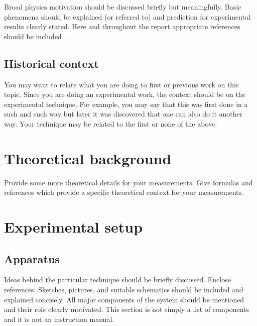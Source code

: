 \documentclass[10pt,letterpaper,onecolumn]{article}
\begin{document}
Broad physics motivation should be discussed briefly but
meaningfully. Basic phenomena should be
explained (or referred to) and
prediction for experimental results clearly
stated. Here and throughout the report appropriate
references should be included~\cite{book, article}.

\subsection{Historical context}

You may want to relate what you are doing to first or previous
work on this topic. Since you are doing an experimental work,
the context should be on the experimental technique. For example,
you may say that this was first done in a such and such way
but later it was discovered
that one can also do it another way. Your technique may be
related to the first or none of the above.



\section{Theoretical background}

Provide some more theoretical details for your measurements.
Give formulas and references which provide a specific theoretical
context for your measurements.



\section{Experimental setup}


\subsection{Apparatus}

Ideas behind the particular technique should be briefly
discussed. Enclose references. Sketches, pictures, and
suitable schematics should be included and explained
concisely. All major components of the system should be
mentioned and their role clearly motivated. This section
is not simply a list of components and it is not an
instruction manual. 


\end{document}
